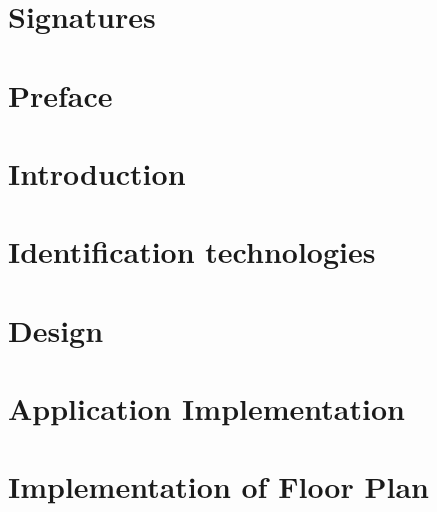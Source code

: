






\thispagestyle{empty}
\cleardoublepage


\chapter*{Signatures}


\newpage
\thispagestyle{empty}
\mbox{}

\chapter*{Preface}
\thispagestyle{empty}


\newpage
\thispagestyle{empty}
\mbox{}

\newpage
\thispagestyle{empty}
\mbox{}

\setcounter{secnumdepth}{3}
\setcounter{tocdepth}{1}

\tableofcontents*

\acresetall %

\chapter{Introduction}\label{chap:intro}




\chapter{Identification technologies}


\chapter{Design}



\chapter{Application Implementation}




\chapter{Implementation of Floor Plan}


